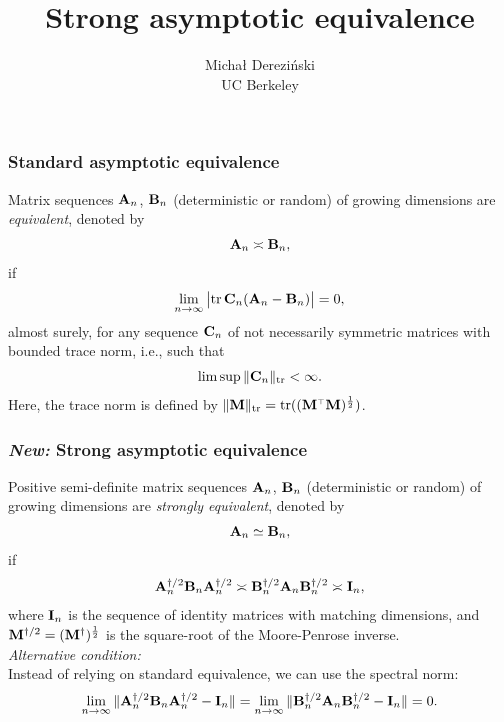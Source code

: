 \documentclass[10pt]{beamer}
\title[]{Strong asymptotic equivalence}
\author[]{Micha{\l} Derezi\'{n}ski\\
UC Berkeley}
\begin{document}
\begin{frame}
  \titlepage
\end{frame}

\linespread{1.3}

\begin{frame}
  \frametitle{Standard asymptotic equivalence}
  Matrix sequences $\mathbf A_n$, $\mathbf B_n$ (deterministic or random) of growing dimensions are
  \emph{equivalent}, denoted by
  \begin{align*}
    \mathbf A_n\asymp \mathbf B_n,
  \end{align*}
  if
  \begin{align*}
    \lim_{n\rightarrow\infty}\big|\mathrm{tr}\,\mathbf C_n(\mathbf A_n-\mathbf B_n)\big| =0,
  \end{align*}
  almost surely, for any sequence $\mathbf C_n$ of not necessarily symmetric matrices with bounded trace
  norm, i.e., such that
  \begin{align*}
    \lim\sup\|\mathbf C_n\|_{\mathrm{tr}}<\infty.
  \end{align*}
  Here, the trace norm is defined by $\|\M\|_{\tr} = \tr((\M^\top\M)^{\frac12})$.
\end{frame}

\begin{frame}
  \frametitle{\emph{New:} Strong asymptotic equivalence}
  Positive semi-definite matrix sequences $\mathbf A_n$, $\mathbf B_n$ (deterministic or random) of growing dimensions are
  \emph{strongly equivalent}, denoted by
  \begin{align*}
    \mathbf A_n\simeq \mathbf B_n,
  \end{align*}
  if
  \begin{align*}
    \mathbf A_n^{\dagger/2}\mathbf B_n\mathbf A_n^{\dagger/2} \asymp
    \mathbf B_n^{\dagger/2}\mathbf A_n\mathbf B_n^{\dagger/2}\asymp \mathbf I_n,
  \end{align*}
  where $\mathbf I_n$ is the sequence of identity matrices with matching
  dimensions, and $\mathbf M^{\dagger/2}=(\mathbf M^\dagger)^{\frac12}$ is the
  square-root of the Moore-Penrose inverse.\\[5mm]
  \emph{Alternative condition:} \\
  Instead of relying on standard equivalence, we can use the spectral norm:
  \begin{align*}
    \lim_{n\rightarrow\infty}\|\mathbf A_n^{\dagger/2}\mathbf B_n\mathbf A_n^{\dagger/2} -
    \mathbf I_n\|
    =
        \lim_{n\rightarrow\infty}\|
    \mathbf B_n^{\dagger/2}\mathbf A_n\mathbf B_n^{\dagger/2} - \mathbf I_n\|
    = 0.
  \end{align*}
\end{frame}
\end{document}
